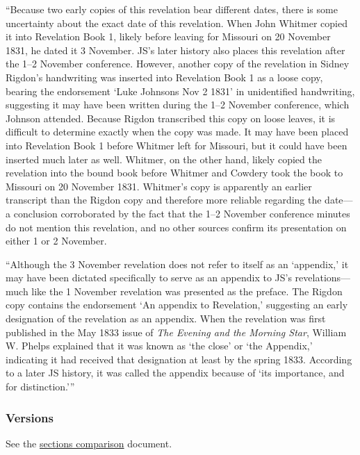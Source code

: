 			``Because two early copies of this revelation bear different dates, there is some uncertainty about the exact date of this revelation. When John Whitmer copied it into Revelation Book 1, likely before leaving for Missouri on 20 November 1831, he dated it 3 November. JS's later history also places this revelation after the 1--2 November conference. However, another copy of the revelation in Sidney Rigdon's handwriting was inserted into Revelation Book 1 as a loose copy, bearing the endorsement `Luke Johnsons Nov 2 1831' in unidentified handwriting, suggesting it may have been written during the 1--2 November conference, which Johnson attended. Because Rigdon transcribed this copy on loose leaves, it is difficult to determine exactly when the copy was made. It may have been placed into Revelation Book 1 before Whitmer left for Missouri, but it could have been inserted much later as well. Whitmer, on the other hand, likely copied the revelation into the bound book before Whitmer and Cowdery took the book to Missouri on 20 November 1831. Whitmer's copy is apparently an earlier transcript than the Rigdon copy and therefore more reliable regarding the date---a conclusion corroborated by the fact that the 1--2 November conference minutes do not mention this revelation, and no other sources confirm its presentation on either 1 or 2 November.
			
			``Although the 3 November revelation does not refer to itself as an `appendix,' it may have been dictated specifically to serve as an appendix to JS's revelations---much like the 1 November revelation was presented as the preface. The Rigdon copy contains the endorsement `An appendix to Revelation,' suggesting an early designation of the revelation as an appendix. When the revelation was first published in the May 1833 issue of \textit{The Evening and the Morning Star}, William W. Phelps explained that it was known as `the close' or `the Appendix,' indicating it had received that designation at least by the spring 1833. According to a later JS history, it was called the appendix because of `its importance, and for distinction.'''

	\subsubsection{Versions}
		\label{DC133-V}
		
		See the \href{https://drive.google.com/file/d/1goAvNz8jS4R8slYfMG_db55Ty2z_vmgK/view?usp=sharing}{sections comparison} document.
	
